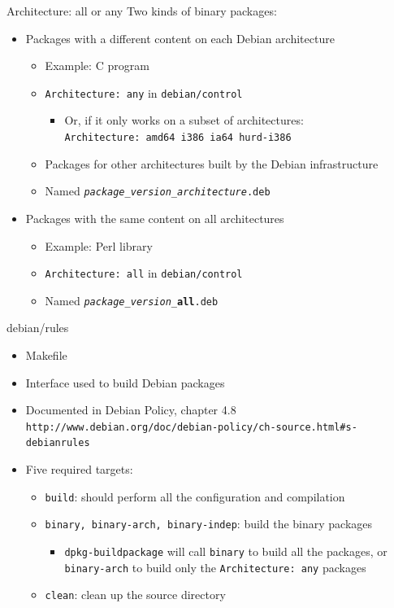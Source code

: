 \documentclass[10pt,final]{beamer}
\begin{document}
\begin{frame}{Architecture: all or any}
  Two kinds of binary packages:
  \hbr
  \begin{itemize}
  \item Packages with a different content on each Debian architecture
    \begin{itemize}
    \item Example: C program
    \item \texttt{Architecture:\ any} in \texttt{debian/control}
      \begin{itemize}
      \item Or, if it only works on a subset of architectures:\\
        \texttt{Architecture:\ amd64 i386 ia64 hurd-i386}
      \end{itemize}
    \item Packages for other architectures built by the Debian infrastructure
    \item Named \texttt{\textsl{package}\_\textsl{version}\_\textsl{architecture}.deb}
    \end{itemize}
    \br
  \item Packages with the same content on all architectures
    \begin{itemize}
    \item Example: Perl library
    \item \texttt{Architecture:\ all} in \texttt{debian/control}
    \item Named \texttt{\textsl{package}\_\textsl{version}\_\textbf{all}.deb}
    \end{itemize}
  \end{itemize}
\end{frame}

\begin{frame}[fragile]{debian/rules}
  \hbr
  \begin{itemize}
  \item Makefile
    \br
  \item Interface used to build Debian packages
    \br
  \item Documented in Debian Policy, chapter 4.8\\
    {\small \texttt{http://www.debian.org/doc/debian-policy/ch-source.html\#s-debianrules}}
    \br
  \item Five required targets:
    \begin{itemize}
    \item \texttt{build}: should perform all the configuration and compilation
      \hbr
    \item \texttt{binary, binary-arch, binary-indep}: build the binary packages
      \begin{itemize}
      \item \texttt{dpkg-buildpackage} will call \texttt{binary} to build all
        the packages, or \texttt{binary-arch} to build only the
        \texttt{Architecture:~any} packages
      \end{itemize}
      \hbr
    \item \texttt{clean}: clean up the source directory
    \end{itemize}
  \end{itemize}
\end{frame}
\end{document}
